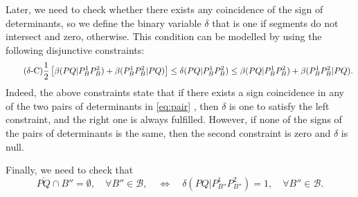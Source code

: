 \documentclass[a4paper,  review, authoryear, 1p.]{elsarticle}
\newcommand{\B}{{\mathcal B}}
\newcommand{\ES}{{E^{}_{S}}}
\newcommand{\segment}[2]{\overline{#1#2}}
\newcommand{\determinant}[3]{\det({#1|#2#3})}
\begin{document}
		\bigskip
		
		\newcommand{\deltacheck}[4]{\delta(#1#2|#3#4)}
		
		Later, we need to check whether there exists any coincidence of the sign of determinants, so we define the binary variable $\delta$ that is one if segments do not intersect and zero, otherwise. This condition can be modelled by using the following disjunctive constraints:
		\begin{equation*}\tag{$\delta$-C}\label{eq:deltaC}
			\frac{1}{2}\left[\betamas{P}{Q}{P_B^1}{P_B^2}+\betamas{P_B^1}{P_B^2}{P}{Q}\right]\leq\deltacheck{P}{Q}{P_B^1}{P_B^2}\leq \betamas{P}{Q}{P_B^1}{P_B^2}+\betamas{P_B^1}{P_B^2}{P}{Q}.
		\end{equation*}
		Indeed, the above constraints state that if there exists a sign coincidence in any of the two pairs of determinants in \eqref{eq:pair} , then $\delta$ is one to satisfy the left constraint, and the right one is always fulfilled. However, if none of the signs of the pairs of determinants is the same, then the second constraint is zero and $\delta$ is null.
		
		Finally, we need to check that
		$$\overline{PQ}\cap B''=\emptyset,\quad \forall B''\in\B,\quad\Longleftrightarrow\quad \deltacheck{P}{Q}{P_{B''}^1}{P_{B''}^2}=1,\quad\forall B''\in\B.$$
		
		
		\newcommand{\varepsilonvar}[2]{\varepsilon(#1#2)}
		
\end{document}
